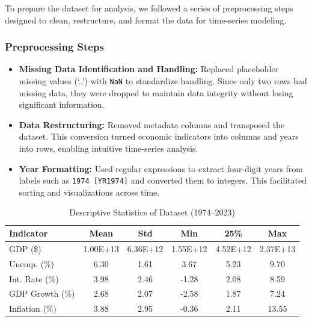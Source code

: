 \documentclass[conference]{IEEEtran}
\begin{document}
To prepare the dataset for analysis, we followed a series of preprocessing steps designed to clean, restructure, and format the data for time-series modeling.

\subsubsection{Preprocessing Steps}

\begin{itemize}
    \item \textbf{Missing Data Identification and Handling:} Replaced placeholder missing values (‘..’) with \texttt{NaN} to standardize handling. Since only two rows had missing data, they were dropped to maintain data integrity without losing significant information.

    \item \textbf{Data Restructuring:} Removed metadata columns and transposed the dataset. This conversion turned economic indicators into columns and years into rows, enabling intuitive time-series analysis.

    \item \textbf{Year Formatting:} Used regular expressions to extract four-digit years from labels such as \texttt{1974 [YR1974]} and converted them to integers. This facilitated sorting and visualizations across time.
\end{itemize}
\begin{table}[ht]
\caption{Descriptive Statistics of Dataset (1974–2023)}
\label{tab:stats}
\centering
\begin{tabular}{@{}lccccc@{}}
\toprule
Indicator & Mean & Std & Min & 25\% & Max \\
\midrule
GDP (\$) & 1.00E+13 & 6.36E+12 & 1.55E+12 & 4.52E+12 & 2.37E+13 \\
Unemp. (\%) & 6.30 & 1.61 & 3.67 & 5.23 & 9.70 \\
Int. Rate (\%) & 3.98 & 2.46 & -1.28 & 2.08 & 8.59 \\
GDP Growth (\%) & 2.68 & 2.07 & -2.58 & 1.87 & 7.24 \\
Inflation (\%) & 3.88 & 2.95 & -0.36 & 2.11 & 13.55 \\
\bottomrule
\end{tabular}
\end{table}
\end{document}
